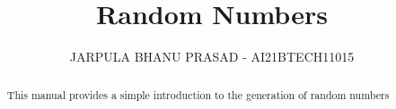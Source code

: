 \documentclass[journal,12pt,twocolumn]{IEEEtran}
\renewcommand\thesection{\arabic{section}}
\begin{document}
\let\StandardTheFigure\thefigure
\renewcommand{\thefigure}{\thesection}



\makeatletter
{}
\makeatother

\let\StandardTheFigure\thefigure
\let\StandardTheTable\thetable
\let\vec\mathbf
{}

\vspace{3cm}


\title{%
	Random Numbers
}

%
%
%

\author{JARPULA BHANU PRASAD - AI21BTECH11015}
\maketitle

\tableofcontents

\bigskip

\renewcommand{\thefigure}{\theenumi}
\renewcommand{\thetable}{\theenumi}

\begin{abstract}
This manual provides a simple introduction to the generation of random numbers
\end{abstract}
\end{document}
